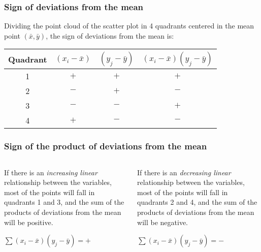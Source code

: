 \begin{frame}
\frametitle{Sign of deviations from the mean}
Dividing the point cloud of the scatter plot in 4 quadrants centered in the mean point $(\bar x, \bar y)$, the sign of
deviations from the mean is:
\begin{center}
\resizebox*{!}{0.5\textheight}{}
\begin{tabular}{cccc}
Quadrant & $(x_i-\bar x)$ & $(y_j-\bar y)$ & $(x_i-\bar x)(y_j-\bar y)$\\
\hline
1 & $+$ & $+$ & \alert{$+$}\\
2 & $-$ & $+$ & \alert{$-$}\\
3 & $-$ & $-$ & \alert{$+$}\\
4 & $+$ & $-$ & \alert{$-$}\\
\hline
\end{tabular}
\end{center}
\end{frame}


\begin{frame}
\frametitle{Sign of the product of deviations from the mean}
\begin{columns}[t]
\begin{column}{0.5\textwidth}
If there is an \emph{increasing linear} relationship between the variables, most of the points will fall in quadrants 1
and 3, and the sum of the products of deviations from the mean will be positive.

\centering
\resizebox{0.9\textwidth}{!}{}

$\sum(x_i-\bar x)(y_j-\bar y) = +$
\end{column}

\begin{column}{0.5\textwidth}
If there is an \emph{decreasing linear} relationship between the variables, most of the points will fall in quadrants 2
and 4, and the sum of the products of deviations from the mean will be negative.

\centering
\resizebox{0.9\textwidth}{!}{}

$\sum(x_i-\bar x)(y_j-\bar y) = -$
\end{column}
\end{columns}
\end{frame}


